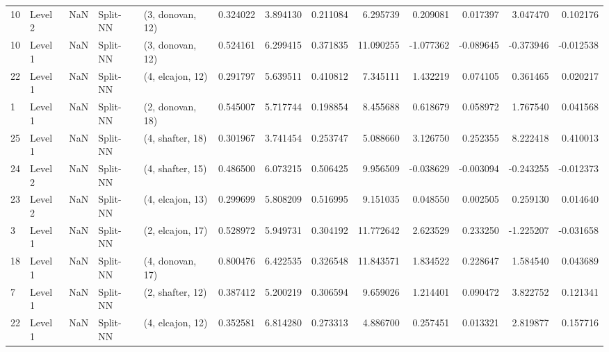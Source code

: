 \begin{tabular}{llrllrrrrrrrr}
10 &   Level 2 &    NaN &       Split-NN &  (3, donovan, 12) &   0.324022 &   3.894130 &  0.211084 &   6.295739 &             0.209081 &               0.017397 &            3.047470 &              0.102176 \\
10 &   Level 1 &    NaN &       Split-NN &  (3, donovan, 12) &   0.524161 &   6.299415 &  0.371835 &  11.090255 &            -1.077362 &              -0.089645 &           -0.373946 &             -0.012538 \\
22 &   Level 1 &    NaN &       Split-NN &  (4, elcajon, 12) &   0.291797 &   5.639511 &  0.410812 &   7.345111 &             1.432219 &               0.074105 &            0.361465 &              0.020217 \\
1  &   Level 1 &    NaN &       Split-NN &  (2, donovan, 18) &   0.545007 &   5.717744 &  0.198854 &   8.455688 &             0.618679 &               0.058972 &            1.767540 &              0.041568 \\
25 &   Level 1 &    NaN &       Split-NN &  (4, shafter, 18) &   0.301967 &   3.741454 &  0.253747 &   5.088660 &             3.126750 &               0.252355 &            8.222418 &              0.410013 \\
24 &   Level 2 &    NaN &       Split-NN &  (4, shafter, 15) &   0.486500 &   6.073215 &  0.506425 &   9.956509 &            -0.038629 &              -0.003094 &           -0.243255 &             -0.012373 \\
23 &   Level 2 &    NaN &       Split-NN &  (4, elcajon, 13) &   0.299699 &   5.808209 &  0.516995 &   9.151035 &             0.048550 &               0.002505 &            0.259130 &              0.014640 \\
3  &   Level 1 &    NaN &       Split-NN &  (2, elcajon, 17) &   0.528972 &   5.949731 &  0.304192 &  11.772642 &             2.623529 &               0.233250 &           -1.225207 &             -0.031658 \\
18 &   Level 1 &    NaN &       Split-NN &  (4, donovan, 17) &   0.800476 &   6.422535 &  0.326548 &  11.843571 &             1.834522 &               0.228647 &            1.584540 &              0.043689 \\
7  &   Level 1 &    NaN &       Split-NN &  (2, shafter, 12) &   0.387412 &   5.200219 &  0.306594 &   9.659026 &             1.214401 &               0.090472 &            3.822752 &              0.121341 \\
22 &   Level 1 &    NaN &       Split-NN &  (4, elcajon, 12) &   0.352581 &   6.814280 &  0.273313 &   4.886700 &             0.257451 &               0.013321 &            2.819877 &              0.157716 \\

\end{tabular}
